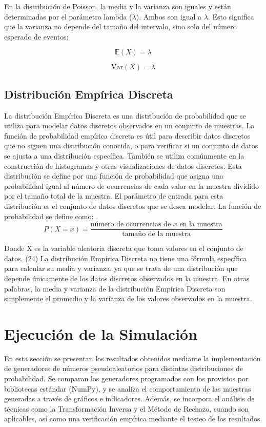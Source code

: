 \documentclass{article}
\begin{document}
En la distribución de Poisson, la media y la varianza son iguales y están determinadas por el parámetro lambda ($\lambda$). Ambos son igual a $\lambda$. Esto significa que la varianza no depende del tamaño del intervalo, sino solo del número esperado de eventos:

\begin{equation}
    \mathbb{E}(X) = \lambda
\end{equation}

\begin{equation}
    \mathrm{Var}(X) = \lambda
\end{equation}

\subsection{Distribución Empírica Discreta}
La distribución Empírica Discreta es una distribución de probabilidad que se utiliza para modelar datos discretos observados en un conjunto de muestras. La función de probabilidad empírica discreta es útil para describir datos discretos que no siguen una distribución conocida, o para verificar si un conjunto de datos se ajusta a una distribución específica. También se utiliza comúnmente en la construcción de histogramas y otras visualizaciones de datos discretos.
Esta distribución se define por una función de probabilidad que asigna una probabilidad igual al número de ocurrencias de cada valor en la muestra dividido por el tamaño total de la muestra. El parámetro de entrada para esta distribución es el conjunto de datos discretos que se desea modelar. La función de probabilidad se define como:
\begin{equation}
    P(X = x) = \frac{\text{número de ocurrencias de } x \text{ en la muestra}}{\text{tamaño de la muestra}}
\end{equation}

Donde X es la variable aleatoria discreta que toma valores en el conjunto de datos. (24) La distribución Empírica Discreta no tiene una fórmula específica para calcular su media y varianza, ya que se trata de una distribución que depende únicamente de los datos discretos observados en la muestra. En otras palabras, la media y varianza de la distribución Empírica Discreta son simplemente el promedio y la varianza de los valores observados en la muestra.

\section{Ejecución de la Simulación}
En esta sección se presentan los resultados obtenidos mediante la implementación de generadores de números pseudoaleatorios para distintas distribuciones de probabilidad. Se comparan los generadores programados con los provistos por bibliotecas estándar (NumPy), y se analiza el comportamiento de las muestras generadas a través de gráficos e indicadores. Además, se incorpora el análisis de técnicas como la Transformación Inversa y el Método de Rechazo, cuando son aplicables, así como una verificación empírica mediante el testeo de los resultados.
\end{document}
